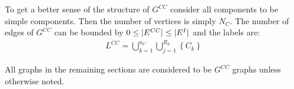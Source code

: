 To get a better sense of the structure of $G^{CC}$ consider all components to be simple components. Then the number of vertices is simply $N_C$. The number of edges of $G^{CC}$ can be bounded by $0 \leq \lvert E^{CC}\rvert \leq \lvert E^I\rvert$ and the labels are:
\begin{align}
{L}^{CC} = \bigcup_{k=1}^{n_C} \bigcup_{j=1}^{R_k} \left\lbrace C_k \right\rbrace
\end{align}

\noindent All graphs in the remaining sections are considered to be $G^{CC}$ graphs unless otherwise noted.
